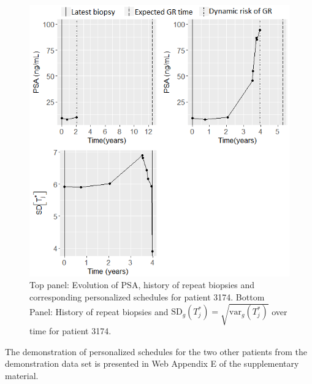 \begin{figure}
\centerline{\includegraphics[width=\columnwidth]{images/prias_demo/case_3174.png}}
\caption{Top panel: Evolution of PSA, history of repeat biopsies and corresponding personalized schedules for patient 3174. Bottom Panel: History of repeat biopsies and $\mbox{SD}_g(T^*_j) = \sqrt{\mbox{var}_g(T^*_j)}$ over time for patient 3174.}
\label{fig : prias_demo_pid_3174}
\end{figure}

The demonstration of personalized schedules for the two other patients from the demonstration data set is presented in Web Appendix E of the supplementary material.
